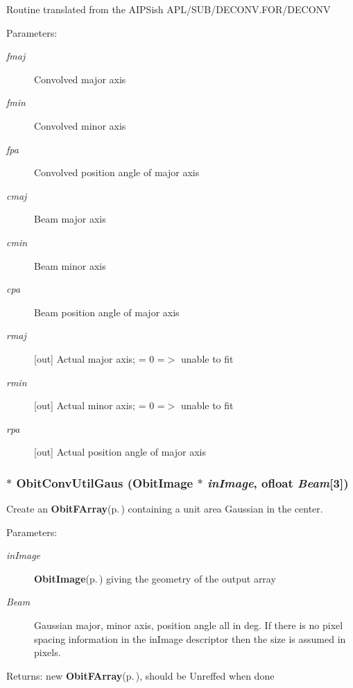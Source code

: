 Routine translated from the AIPSish APL/SUB/DECONV.FOR/DECONV \begin{Desc}
\item[Parameters:]
\begin{description}
\item[{\em fmaj}]Convolved major axis \item[{\em fmin}]Convolved minor axis \item[{\em fpa}]Convolved position angle of major axis \item[{\em cmaj}]Beam major axis \item[{\em cmin}]Beam minor axis \item[{\em cpa}]Beam position angle of major axis \item[{\em rmaj}][out] Actual major axis; = 0 =$>$ unable to fit \item[{\em rmin}][out] Actual minor axis; = 0 =$>$ unable to fit \item[{\em rpa}][out] Actual position angle of major axis \end{description}
\end{Desc}
\subsubsection{$\ast$ Obit\-Conv\-Util\-Gaus ({\bf Obit\-Image} $\ast$ {\em in\-Image}, {\bf ofloat} {\em Beam}[3])}\label{ObitConvUtil_8h_a2}


Create an {\bf Obit\-FArray}{\rm (p.\,\pageref{structObitFArray})} containing a unit area Gaussian in the center. 

\begin{Desc}
\item[Parameters:]
\begin{description}
\item[{\em in\-Image}]{\bf Obit\-Image}{\rm (p.\,\pageref{structObitImage})} giving the geometry of the output array \item[{\em Beam}]Gaussian major, minor axis, position angle all in deg. If there is no pixel spacing information in the in\-Image descriptor then the size is assumed in pixels. \end{description}
\end{Desc}
\begin{Desc}
\item[Returns:]new {\bf Obit\-FArray}{\rm (p.\,\pageref{structObitFArray})}, should be Unreffed when done \end{Desc}
